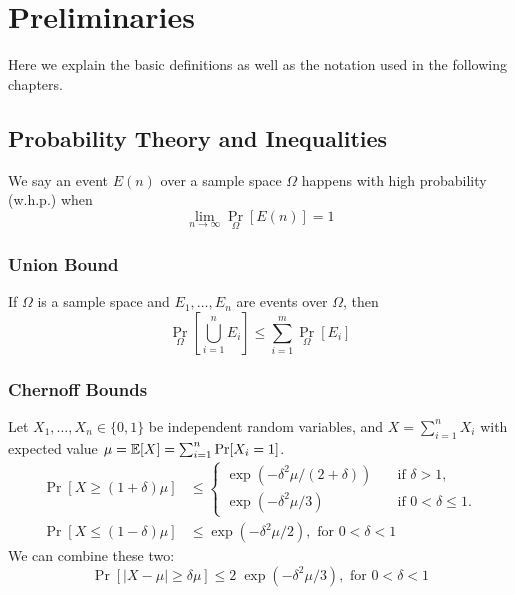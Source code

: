 \chapter{Preliminaries}
\label{ch:prelims}

Here we explain the basic definitions as well as the notation used in the following chapters.

\section{Probability Theory and Inequalities}

We say an event $E(n)$ over a sample space $\Omega$
happens with high probability (w.h.p.) when
\begin{equation}
    \lim_{n\to\infty}{\Pr_\Omega[E(n)]}=1
\end{equation}

\subsection{Union Bound}

If $\Omega$ is a sample space and $E_1,\ldots,E_n$ are events over $\Omega$, then
\begin{equation}
    \Pr_\Omega\left[\bigcup_{i=1}^n{E_i}\right]\leq\sum_{i=1}^m{\Pr_\Omega\left[E_i\right]}
\end{equation}

\subsection{Chernoff Bounds}

Let $X_1,\ldots,X_n\in\{0,1\}$ be independent random variables,
and $X=\sum_{i=1}^n{X_i}$ with expected value
$\mu=\mathop{{}\mathbb{E}}[X]=\sum_{i=1}^n{\Pr[X_i=1]}$.
\begin{align}
    \Pr[X\geq(1+\delta)\mu]&\leq
    \begin{cases}
        \exp(-\delta^2\mu/(2+\delta)) & \quad \text{if } \delta>1,\\
        \exp(-\delta^2\mu/3) & \quad \text{if } 0<\delta\leq 1.
    \end{cases}\\
    \label{eq:chernoff-lower-tail}
    \Pr[X\leq(1-\delta)\mu]&\leq \exp(-\delta^2\mu/2),\text{ for }0<\delta<1
\end{align}
We can combine these two:
\begin{equation}
    \label{eq:chernoff-combined}
    \Pr[|X-\mu|\geq\delta\mu]\leq 2\;\exp(-\delta^2\mu/3),\text{ for }0<\delta<1
\end{equation}

